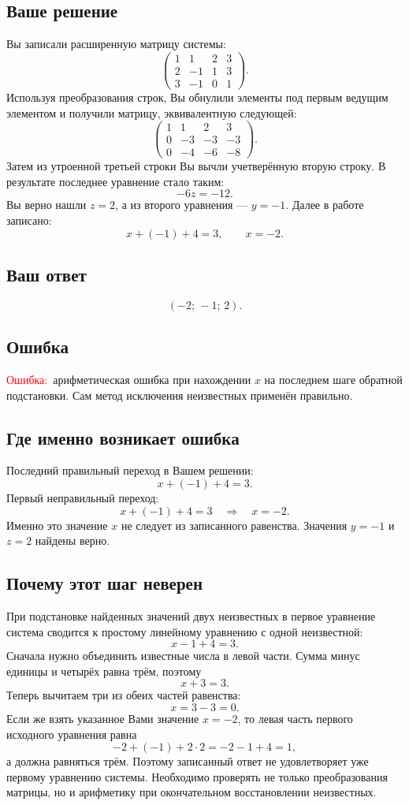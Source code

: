 \documentclass[12pt,a4paper]{article}
\newcommand{\mistake}{\textcolor{red}{Ошибка:}}
\begin{document}
\subsection*{Ваше решение}
Вы записали расширенную матрицу системы:
\[
\left(\begin{array}{rrr|r}
1&1&2&3\\ 2&-1&1&3\\ 3&-1&0&1
\end{array}\right).
\]
Используя преобразования строк, Вы обнулили элементы под первым ведущим элементом и получили матрицу, эквивалентную следующей:
\[
\left(\begin{array}{rrr|r}
1&1&2&3\\ 0&-3&-3&-3\\ 0&-4&-6&-8
\end{array}\right).
\]
Затем из утроенной третьей строки Вы вычли учетверённую вторую строку. В результате последнее уравнение стало таким:
\[
-6z=-12.
\]
Вы верно нашли $z=2$, а из второго уравнения --- $y=-1$. Далее в работе записано:
\[
x+(-1)+4=3,\qquad \boxed{x=-2}.
\]

\subsection*{Ваш ответ}
\[
\boxed{(-2;\,-1;\,2)}.
\]

\subsection*{Ошибка}
\mistake\ арифметическая ошибка при нахождении $x$ на последнем шаге обратной подстановки. Сам метод исключения неизвестных применён правильно.

\subsection*{Где именно возникает ошибка}
Последний правильный переход в Вашем решении:
\[
x+(-1)+4=3.
\]
Первый неправильный переход:
\[
x+(-1)+4=3\quad\Longrightarrow\quad x=-2.
\]
Именно это значение $x$ не следует из записанного равенства. Значения $y=-1$ и $z=2$ найдены верно.

\subsection*{Почему этот шаг неверен}
При подстановке найденных значений двух неизвестных в первое уравнение система сводится к простому линейному уравнению с одной неизвестной:
\[
x-1+4=3.
\]
Сначала нужно объединить известные числа в левой части. Сумма минус единицы и четырёх равна трём, поэтому
\[
x+3=3.
\]
Теперь вычитаем три из обеих частей равенства:
\[
x=3-3=0.
\]
Если же взять указанное Вами значение $x=-2$, то левая часть первого исходного уравнения равна
\[
-2+(-1)+2\cdot2=-2-1+4=1,
\]
а должна равняться трём. Поэтому записанный ответ не удовлетворяет уже первому уравнению системы. Необходимо проверять не только преобразования матрицы, но и арифметику при окончательном восстановлении неизвестных.
\end{document}
